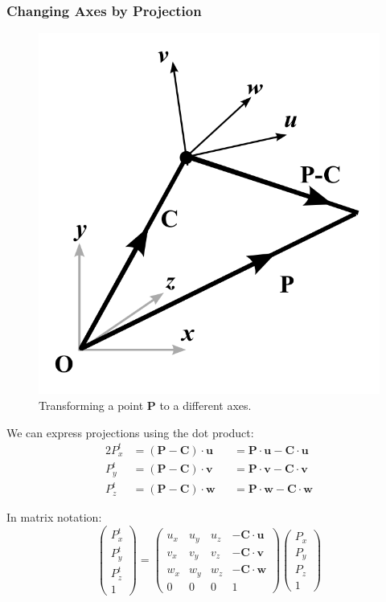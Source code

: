\documentclass[11pt]{article}
\begin{document}
\subsubsection{Changing Axes by Projection}
\begin{figure}[htb!]
  \caption{Transforming a point $\bm{P}$ to a different axes.}
  \includegraphics[scale=0.2]{changingaxes}
  \centering
\end{figure}

We can express projections using the dot product:
\begin{alignat*}{2}
  P_x^t &= (\bm{P} - \bm{C}) \cdot \bm{u} &&= \bm{P} \cdot \bm{u} - \bm{C} \cdot \bm{u} \\
  P_y^t &= (\bm{P} - \bm{C}) \cdot \bm{v} &&= \bm{P} \cdot \bm{v} - \bm{C} \cdot \bm{v} \\
  P_z^t &= (\bm{P} - \bm{C}) \cdot \bm{w} &&= \bm{P} \cdot \bm{w} - \bm{C} \cdot \bm{w}
\end{alignat*}

In matrix notation:
\[
  \begin{pmatrix} P_x^t \\ P_y^t \\ P_z^t \\ 1 \end{pmatrix}
  =
  \begin{pmatrix}
    u_x & u_y & u_z & -\bm{C} \cdot \bm{u} \\ 
    v_x & v_y & v_z & -\bm{C} \cdot \bm{v} \\ 
    w_x & w_y & w_z & -\bm{C} \cdot \bm{w} \\ 
    0 & 0 & 0 & 1
  \end{pmatrix}
  \begin{pmatrix} P_x \\ P_y \\ P_z \\ 1 \end{pmatrix}
\]
\end{document}
